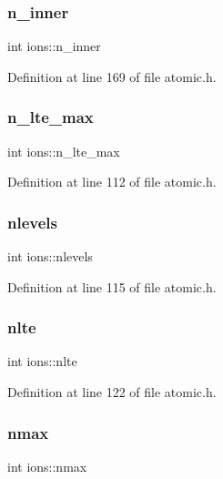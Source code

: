 \subsubsection{\texorpdfstring{n\+\_\+inner}{n\_inner}}
{\footnotesize\ttfamily int ions\+::n\+\_\+inner}



Definition at line 169 of file atomic.\+h.

\mbox{\label{structions_ad1a3502b3bb9e66a5f6c26271b2d4785}} 
\subsubsection{\texorpdfstring{n\+\_\+lte\+\_\+max}{n\_lte\_max}}
{\footnotesize\ttfamily int ions\+::n\+\_\+lte\+\_\+max}



Definition at line 112 of file atomic.\+h.

\mbox{\label{structions_ae5bd51a01c8a5b1b68f89a3b3b545510}} 
\subsubsection{\texorpdfstring{nlevels}{nlevels}}
{\footnotesize\ttfamily int ions\+::nlevels}



Definition at line 115 of file atomic.\+h.

\mbox{\label{structions_ad10a7e7016ca466bb48a388847845b8e}} 
\subsubsection{\texorpdfstring{nlte}{nlte}}
{\footnotesize\ttfamily int ions\+::nlte}



Definition at line 122 of file atomic.\+h.

\mbox{\label{structions_ae19d58cf3058c3b595159e14a5b6ecc3}} 
\subsubsection{\texorpdfstring{nmax}{nmax}}
{\footnotesize\ttfamily int ions\+::nmax}



